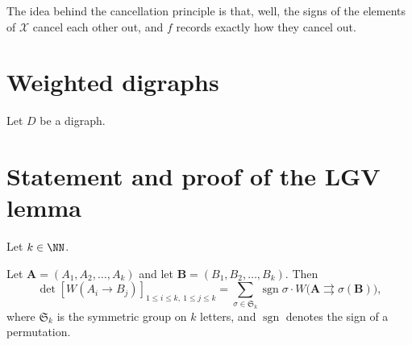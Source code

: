 \documentclass{article}
\newcommand\toto{\rightrightarrows}
\DeclareMathOperator{\sgn}{sgn}
\begin{document}
The idea behind the cancellation principle is that, well, the signs of the elements of $\mathcal{X}$ cancel each other out, and $f$ records exactly how they cancel out. 

\section{Weighted digraphs}

\begin{definition}
    Let $D$ be a digraph.
\end{definition}

\section{Statement and proof of the LGV lemma}


\begin{theorem*} 
    Let $k \in \NN$. 

    Let $\mathbf{A} = (A_1, A_2, \ldots, A_k)$ and let $\mathbf{B} = (B_1, B_2, \ldots, B_k)$. Then
    \[
        \det \left[W(A_i{\to}B_j)\right]_{1\leq i \leq k,\: 1\leq j \leq k} = \sum_{\sigma\in \mathfrak{S}_k} \sgn \sigma \cdot W\big(\mathbf{A}{\toto}\sigma(\mathbf{B})\big),
    \]
    where $\mathfrak{S}_k$ is the symmetric group on $k$ letters, and $\sgn$ denotes the sign of a permutation.
\end{theorem*}
\end{document}
